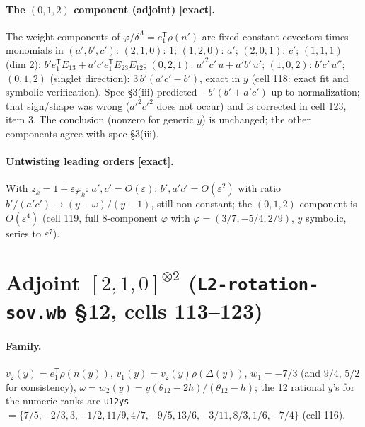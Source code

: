 \documentclass[11pt]{article}
\newcommand{\eT}{e_1^{\mathsf T}}
\newcommand{\thh}{\theta_{12}}
\newcommand{\ex}{\textbf{[exact]}}
\newcommand{\nb}[1]{\texttt{#1}}
\begin{document}
\paragraph{The $(0,1,2)$ component (adjoint) \ex.} The weight components of $\varphi/\delta^\Lambda=\eT\rho(n')$ are fixed constant covectors times monomials in $(a',b',c')$: $(2,1,0)$: $1$; $(1,2,0)$: $a'$; $(2,0,1)$: $c'$; $(1,1,1)$ (dim 2): $b'\eT E_{13}+a'c'\eT E_{23}E_{12}$; $(0,2,1)$: $a'^2c'\,u+a'b'\,u'$; $(1,0,2)$: $b'c'\,u''$; $(0,1,2)$ (singlet direction): $3\,b'(a'c'-b')$, exact in $y$ (cell 118: exact fit and symbolic verification). Spec \S3(iii) predicted $-b'(b'+a'c')$ up to normalization; that sign/shape was wrong ($a'^2c'^2$ does not occur) and is corrected in cell 123, item 3. The conclusion (nonzero for generic $y$) is unchanged; the other components agree with spec \S3(iii).

\paragraph{Untwisting leading orders \ex.} With $z_k=1+\varepsilon\varphi_k$: $a',c'=O(\varepsilon)$; $b',a'c'=O(\varepsilon^2)$ with ratio $b'/(a'c')\to(y-\omega)/(y-1)$, still non-constant; the $(0,1,2)$ component is $O(\varepsilon^4)$ (cell 119, full 8-component $\varphi$ with $\varphi=(3/7,-5/4,2/9)$, $y$ symbolic, series to $\varepsilon^7$).

\section{Adjoint $[2,1,0]^{\otimes2}$ (\nb{L2-rotation-sov.wb} \S12, cells 113--123)}\label{sec:adj}

\paragraph{Family.} $v_2(y)=\eT\rho(n(y))$, $v_1(y)=v_2(y)\rho(\Delta(y))$, $w_1=-7/3$ (and $9/4$, $5/2$ for consistency), $\omega=w_2(y)=y(\thh-2h)/(\thh-h)$; the 12 rational $y$'s for the numeric ranks are \nb{u12ys} $=\{7/5,-2/3,3,-1/2,11/9,4/7,-9/5,13/6,-3/11,8/3,1/6,-7/4\}$ (cell 116).
\end{document}
